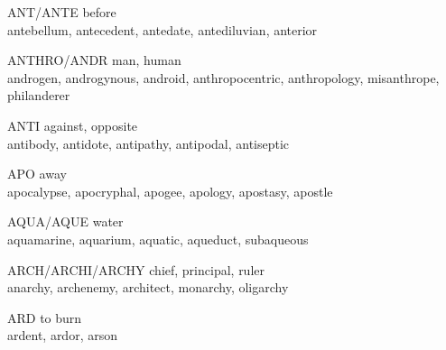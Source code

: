 \begin{flashcard}[Roots]{ANT/ANTE}
before\\
\vspace{0.2in}
antebellum, antecedent, antedate, antediluvian, anterior\\
\end{flashcard}

\begin{flashcard}[Roots]{ANTHRO/ANDR}
man, human\\
\vspace{0.2in}
 androgen, androgynous, android, anthropocentric, anthropology, misanthrope, philanderer\\
\end{flashcard}

\begin{flashcard}[Roots]{ANTI}
against, opposite\\
\vspace{0.2in}
antibody, antidote, antipathy, antipodal, antiseptic\\
\end{flashcard}

\begin{flashcard}[Roots]{APO}
away\\
\vspace{0.2in}
apocalypse, apocryphal, apogee, apology, apostasy, apostle\\
\end{flashcard}

\begin{flashcard}[Roots]{AQUA/AQUE}
water\\
\vspace{0.2in}
 aquamarine, aquarium, aquatic, aqueduct, subaqueous\\
\end{flashcard}

\begin{flashcard}[Roots]{ARCH/ARCHI/ARCHY}
chief, principal, ruler\\
\vspace{0.2in}
anarchy, archenemy, architect, monarchy, oligarchy\\
\end{flashcard}

\begin{flashcard}[Roots]{ARD}
to burn\\
\vspace{0.2in}
ardent, ardor, arson\\
\end{flashcard}

